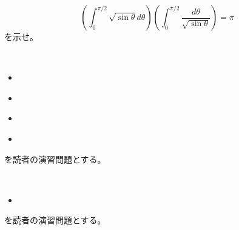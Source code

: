 \documentclass[report]{jlreq}
\begin{document}
\begin{problem}
    \begin{equation}
        \left(\int_0^{\pi/2} \sqrt{\sin \theta} d\theta\right)
        \left(\int_0^{\pi/2} \frac{d\theta}{\sqrt{\sin\theta}}\right)
        = \pi
    \end{equation}
    を示せ。
\end{problem}

\begin{problem}[積分]
    \,
    \begin{itemize}
        \item \cite[第III章 例題8.1]{杉浦+89}
        \item \cite[第III章 問8.1 (1)-(6)]{杉浦+89}
        \item \cite[第III章 問8.2 (1),(2)]{杉浦+89}
        \item \cite[第III章 問8.3 (1)]{杉浦+89}
    \end{itemize}
    を読者の演習問題とする。
\end{problem}

\begin{problem}
    \,
    \begin{itemize}
        \item \cite[第III章 例題8.5]{杉浦+89}
    \end{itemize}
    を読者の演習問題とする。
\end{problem}
\end{document}
